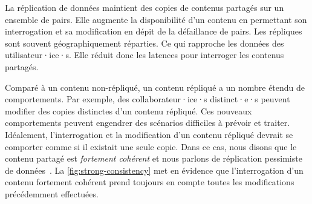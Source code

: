 La réplication de données maintient des copies de contenus partagés sur un ensemble de pairs.
Elle augmente la disponibilité d'un contenu en permettant son interrogation et sa modification en dépit de la défaillance de pairs.
Les répliques sont souvent géographiquement réparties.
Ce qui rapproche les données des utilisateur·ice·s.
Elle réduit donc les latences pour interroger les contenus partagés.

Comparé à un contenu non-répliqué, un contenu répliqué a un nombre étendu de comportements.
Par exemple, des collaborateur·ice·s distinct·e·s peuvent modifier des copies distinctes d'un contenu répliqué.
Ces nouveaux comportements peuvent engendrer des scénarios difficiles à prévoir et traiter.
Idéalement, l'interrogation et la modification d'un contenu répliqué devrait se comporter comme si il existait une seule copie.
Dans ce cas, nous disons que le contenu partagé est \emph{fortement cohérent} et nous parlons de réplication pessimiste de données~\autocite{saito_2005_optimisticreplication}.
La \autoref{fig:strong-consistency} met en évidence que l'interrogation d'un contenu fortement cohérent prend toujours en compte toutes les modifications précédemment effectuées.


